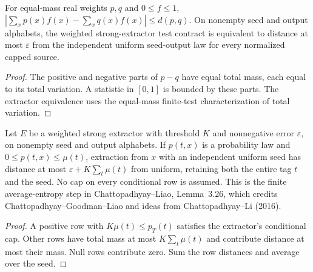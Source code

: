 \begin{theorem}
  \label{thm:lowerbounds-algebraic-bounded-expectations}
  \leanok
  For equal-mass real weights $p,q$ and $0\le f\le1$,
  $|\sum_xp(x)f(x)-\sum_xq(x)f(x)|\le d(p,q)$.
  On nonempty seed and output alphabets, the weighted strong-extractor
  test contract is equivalent to distance at most $\varepsilon$ from the
  independent uniform seed-output law for every normalized capped source.
\end{theorem}
\begin{proof}
  \leanok
  The positive and negative parts of $p-q$ have equal total mass, each
  equal to its total variation. A statistic in $[0,1]$ is bounded by
  these parts. The extractor equivalence uses the equal-mass finite-test
  characterization of total variation.
\end{proof}

\begin{theorem}
  \label{thm:lowerbounds-algebraic-average-leakage}
  \leanok
  Let $E$ be a weighted strong extractor with threshold $K$ and
  nonnegative error $\varepsilon$, on nonempty seed and output alphabets.
  If $p(t,x)$ is a probability law and $0\le p(t,x)\le\mu(t)$, extraction
  from $x$ with an independent uniform seed has distance at most
  $\varepsilon+K\sum_t\mu(t)$ from uniform, retaining both the entire
  tag $t$ and the seed. No cap on every conditional row is assumed.
  This is the finite average-entropy step in Chattopadhyay--Liao,
  Lemma~3.26, which credits Chattopadhyay--Goodman--Liao and ideas from
  Chattopadhyay--Li (2016).
\end{theorem}
\begin{proof}
  \leanok
  A positive row with $K\mu(t)\le p_T(t)$ satisfies the extractor's
  conditional cap. Other rows have total mass at most
  $K\sum_t\mu(t)$ and contribute distance at most their mass. Null
  rows contribute zero. Sum the row distances and average over the seed.
\end{proof}

